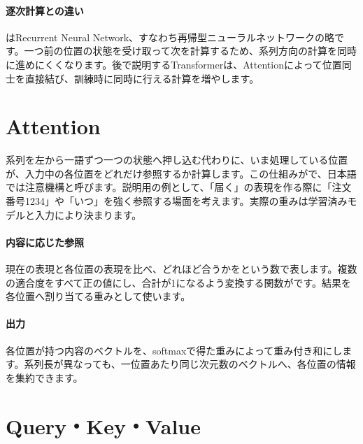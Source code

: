 \paragraph{逐次計算との違い}
    はRecurrent Neural Network、すなわち再帰型ニューラルネットワークの略です。一つ前の位置の状態を受け取って次を計算するため、系列方向の計算を同時に進めにくくなります。後で説明するTransformerは、Attentionによって位置同士を直接結び、訓練時に同時に行える計算を増やします。

\par
\endgroup


\section{Attention}
\label{sec:06-machine-learning-22}

系列を左から一語ずつ一つの状態へ押し込む代わりに、いま処理している位置が、入力中の各位置をどれだけ参照するか計算します。この仕組みがで、日本語では注意機構と呼びます。説明用の例として、「届く」の表現を作る際に「注文番号1234」や「いつ」を強く参照する場面を考えます。実際の重みは学習済みモデルと入力により決まります。

\begingroup
\begingroup
      \centering
\par
\endgroup
\medskip
\begingroup
\paragraph{内容に応じた参照}
        現在の表現と各位置の表現を比べ、どれほど合うかをという数で表します。複数の適合度をすべて正の値にし、合計が1になるよう変換する関数がです。結果を各位置へ割り当てる重みとして使います。

\paragraph{出力}
        各位置が持つ内容のベクトルを、softmaxで得た重みによって重み付き和にします。系列長が異なっても、一位置あたり同じ次元数のベクトルへ、各位置の情報を集約できます。

\par
\endgroup
  \vspace{4mm}
\par
\endgroup


\section{Query・Key・Value}
\label{sec:06-machine-learning-23}

